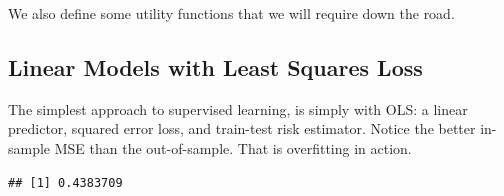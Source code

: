 \documentclass[]{book}
\newenvironment{Shaded}{\begin{snugshade}}{\end{snugshade}}
\newcommand{\CommentTok}[1]{\textcolor[rgb]{0.56,0.35,0.01}{\textit{#1}}}
\newcommand{\ControlFlowTok}[1]{\textcolor[rgb]{0.13,0.29,0.53}{\textbf{#1}}}
\newcommand{\DataTypeTok}[1]{\textcolor[rgb]{0.13,0.29,0.53}{#1}}
\newcommand{\DecValTok}[1]{\textcolor[rgb]{0.00,0.00,0.81}{#1}}
\newcommand{\FloatTok}[1]{\textcolor[rgb]{0.00,0.00,0.81}{#1}}
\newcommand{\KeywordTok}[1]{\textcolor[rgb]{0.13,0.29,0.53}{\textbf{#1}}}
\newcommand{\NormalTok}[1]{#1}
\newcommand{\OperatorTok}[1]{\textcolor[rgb]{0.81,0.36,0.00}{\textbf{#1}}}
\newcommand{\StringTok}[1]{\textcolor[rgb]{0.31,0.60,0.02}{#1}}
\theoremstyle{definition}
\theoremstyle{definition}
\theoremstyle{definition}
\theoremstyle{remark}
\begin{document}
We also define some utility functions that we will require down the road.

\begin{Shaded}
\end{Shaded}

\hypertarget{least-squares}{%
\subsection{Linear Models with Least Squares Loss}\label{least-squares}}

The simplest approach to supervised learning, is simply with OLS: a linear predictor, squared error loss, and train-test risk estimator.
Notice the better in-sample MSE than the out-of-sample. That is overfitting in action.

\begin{Shaded}
\end{Shaded}

\begin{verbatim}
## [1] 0.4383709
\end{verbatim}

\begin{Shaded}
\end{Shaded}
\end{document}
